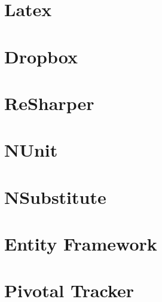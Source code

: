 \section*{Latex}

\section*{Dropbox}

\section*{ReSharper} %

\section*{NUnit}

\section*{NSubstitute}

\section*{Entity Framework}

\section*{Pivotal Tracker}
